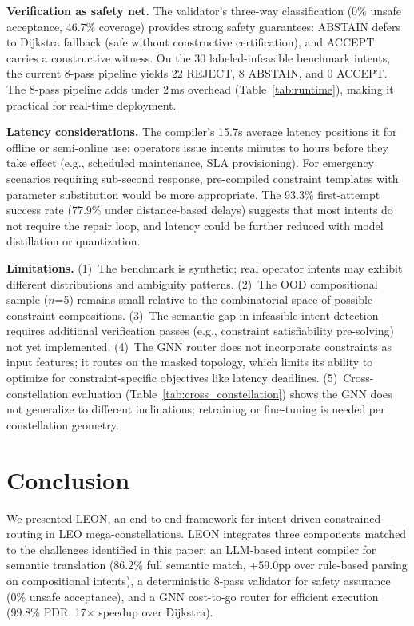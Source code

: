 \documentclass[10pt, conference, letterpaper]{IEEEtran}
\newcommand{\decision}[1]{\textsf{\MakeUppercase{#1}}}
\begin{document}
\textbf{Verification as safety net.}
The validator's three-way classification (0\% unsafe acceptance,
46.7\% coverage) provides strong safety guarantees: \decision{Abstain}
defers to Dijkstra fallback (safe without constructive certification),
and \decision{Accept} carries a constructive witness. On the 30
labeled-infeasible benchmark intents, the current 8-pass pipeline yields
22 \decision{Reject}, 8 \decision{Abstain}, and 0 \decision{Accept}.
The 8-pass pipeline adds under 2\,ms overhead (Table~\ref{tab:runtime}),
making it practical for real-time deployment.

\textbf{Latency considerations.}
The compiler's 15.7s average latency positions it for offline or
semi-online use: operators issue intents minutes to hours before
they take effect (e.g., scheduled maintenance, SLA provisioning).
For emergency scenarios requiring sub-second response, pre-compiled
constraint templates with parameter substitution would be more
appropriate. The 93.3\% first-attempt success rate (77.9\% under
distance-based delays) suggests that most intents do not require the
repair loop, and latency could be further reduced with model
distillation or quantization.

\textbf{Limitations.}
(1)~The benchmark is synthetic; real operator intents may exhibit
different distributions and ambiguity patterns.
(2)~The OOD compositional sample ($n$=5)
remains small relative to the combinatorial space of possible
constraint compositions.
(3)~The semantic gap in infeasible intent detection requires
additional verification passes (e.g., constraint satisfiability
pre-solving) not yet implemented.
(4)~The GNN router does not incorporate constraints as input features;
it routes on the masked topology, which limits its ability to
optimize for constraint-specific objectives like latency deadlines.
(5)~Cross-constellation evaluation (Table~\ref{tab:cross_constellation})
shows the GNN does not generalize to different inclinations; retraining
or fine-tuning is needed per constellation geometry.

\section{Conclusion}
\label{sec:conclusion}

We presented LEON, an end-to-end framework for intent-driven
constrained routing in LEO mega-constellations. LEON integrates three
components matched to the challenges identified in this paper: an
LLM-based intent compiler for semantic translation (86.2\% full
semantic match, +59.0pp over rule-based parsing on compositional
intents), a deterministic 8-pass validator for safety assurance (0\%
unsafe acceptance), and a GNN cost-to-go router for efficient
execution (99.8\% PDR, 17$\times$ speedup over Dijkstra).
\end{document}
